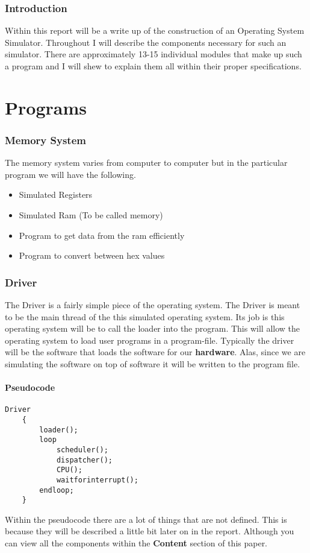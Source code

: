 \documentclass{report}
\begin{document}

\tableofcontents
\pagebreak
\section{Introduction}
Within this report will be a write up of the construction of an Operating System Simulator.
Throughout I will describe the components necessary for such an simulator.
There are approximately 13-15 individual modules that make up such a program and I will shew to explain them all within their proper specifications.
\part{Programs}
\section{Memory System}
The memory system varies from computer to computer but in the particular program we will have the following.

\begin{itemize}
	\item Simulated Registers
	\item Simulated Ram (To be called memory)
	\item Program to get data from the ram efficiently
	\item Program to convert between hex values
\end{itemize}
\section{Driver}
The Driver is a fairly simple piece of the operating system.
The Driver is meant to be the main thread of the this simulated operating system.
Its job is this operating system will be to call the loader into the program.
This will allow the operating system to load user programs in a program-file.
Typically the driver will be the software that loads the software for our \textbf{hardware}.
Alas, since we are simulating the software on top of software it will be written to the program file.

\subsection{Pseudocode}

\begin{lstlisting}
Driver
	{
		loader();
		loop
			scheduler();
			dispatcher();
			CPU();
			waitforinterrupt();
		endloop;
	}
\end{lstlisting}
Within the pseudocode there are a lot of things that are not defined.
This is because they will be described a little bit later on in the report.
Although you can view all the components within the \textbf{Content} section of this paper.
\end{document}

